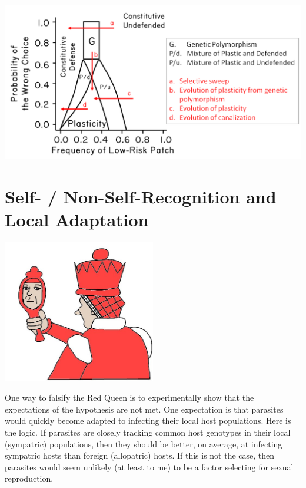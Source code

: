 \documentclass[
  letterpaper,
]{book}
\begin{document}
\begin{tcolorbox}
\includegraphics{images/fig3-7_hr.png}

\end{tcolorbox}



\chapter{Self- / Non-Self-Recognition and Local
Adaptation}\label{self--non-self-recognition-and-local-adaptation}

\begin{center}
\includegraphics[width=0.5\textwidth,height=\textheight]{images/fig4-1.jpeg}
\end{center}

One way to falsify the Red Queen is to experimentally show that the
expectations of the hypothesis are not met. One expectation is that
parasites would quickly become adapted to infecting their local host
populations. Here is the logic. If parasites are closely tracking common
host genotypes in their local (sympatric) populations, then they should
be better, on average, at infecting sympatric hosts than foreign
(allopatric) hosts. If this is not the case, then parasites would seem
unlikely (at least to me) to be a factor selecting for sexual
reproduction.
\end{document}
